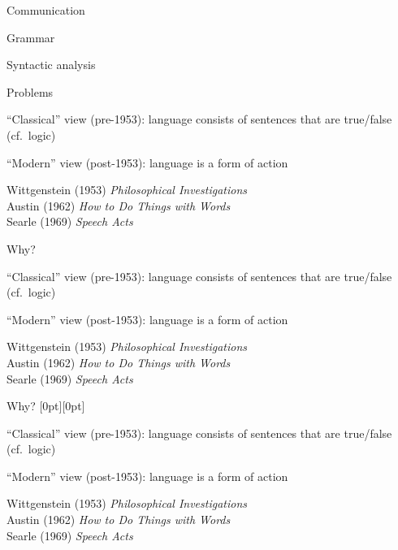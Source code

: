 \documentclass{article}
\begin{document}
\begin{huge}

\sf


\blob Communication

\blob Grammar

\blob Syntactic analysis

\blob Problems





``Classical'' view (pre-1953):\al
   language consists of sentences that are true/false (cf.~logic)

``Modern'' view (post-1953):\al
   language is a form of action

Wittgenstein (1953) \emph{Philosophical Investigations}\\
Austin (1962) \emph{How to Do Things with Words}\\
Searle (1969) \emph{Speech Acts}

Why?



``Classical'' view (pre-1953):\al
   language consists of sentences that are true/false (cf.~logic)

``Modern'' view (post-1953):\al
   language is a form of action

Wittgenstein (1953) \emph{Philosophical Investigations}\\
Austin (1962) \emph{How to Do Things with Words}\\
Searle (1969) \emph{Speech Acts}

Why? \hspace*{5.5in}\epsfxsize=2in\raisebox{-1.5in}[0pt][0pt]{}


``Classical'' view (pre-1953):\al
   language consists of sentences that are true/false (cf.~logic)

``Modern'' view (post-1953):\al
   language is a form of action

Wittgenstein (1953) \emph{Philosophical Investigations}\\
Austin (1962) \emph{How to Do Things with Words}\\
Searle (1969) \emph{Speech Acts}


\end{huge}
\end{document}
